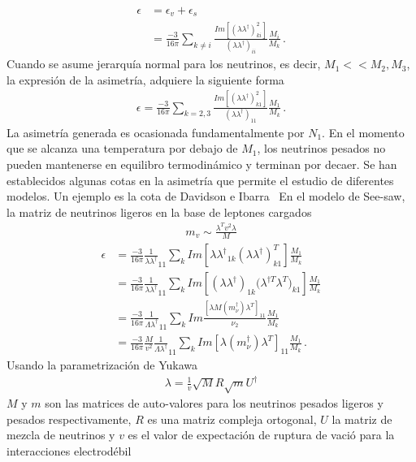 \begin{align}
\epsilon&=\epsilon_{v}+\epsilon_{s}\nonumber\\
&=\frac{-3}{16\pi}\sum_{k\not=i}\frac{Im[({\lambda\lambda^\dagger})_{ki}^2]}{{(\lambda\lambda^\dagger)}_{ii}}\frac{M_i}{M_k}\, . 
\end{align}
Cuando se asume jerarquía normal para los neutrinos, es decir, $M_{1}<<M_{2}, M_{3}$, la expresión de la asimetría, adquiere la siguiente forma
\begin{align}
\epsilon
=\frac{-3}{16\pi}\sum_{k=2,3}\frac{Im[({\lambda\lambda^\dagger})_{k1}^2]}{{(\lambda\lambda^\dagger)}_{11}}\frac{M_1}{M_k}\, . 
\end{align}
La asimetría generada es ocasionada fundamentalmente por $N_{1}$. En el momento que se alcanza una temperatura por debajo de $M_{1}$, los neutrinos pesados no pueden mantenerse en equilibro termodinámico y terminan por decaer.
Se han establecidos algunas cotas en la asimetría que permite el estudio de diferentes modelos. Un ejemplo es la cota de Davidson e Ibarra~\cite{Davidson:2002qv}
En el modelo de See-saw, la matriz de neutrinos ligeros en la base de leptones cargados~\cite{Davidson:2008bu}
\begin{align}
m_{v}\sim \frac{\lambda^Tv^2\lambda}{M}
\end{align}
\begin{align}
\epsilon&=\frac{-3}{16\pi}\frac{1}{\lambda\lambda^\dagger}_{11}\sum_{k}Im[{\lambda\lambda^\dagger}_{1k}{(\lambda\lambda^\dagger)}_{k1}^T]\frac{M_{1}}{M_{k}}\nonumber\\
&=\frac{-3}{16\pi}\frac{1}{\lambda\lambda^\dagger}_{11}\sum_{k}Im[({\lambda\lambda^\dagger})_{1k}{(\lambda^{\dagger T}\lambda^T})_{k1}]\frac{M_{1}}{M_{k}}\nonumber\\
&=\frac{-3}{16\pi}\frac{1}{\Lambda\lambda^\dagger}_{11}\sum_{k}Im
\frac{[\lambda M(m_{\nu}^{\dagger})\lambda^{T}]_{11}}{\nu_{2}}\frac{M_{1}}{M_{k}}
\nonumber\\
&=\frac{-3}{16\pi}\frac{M}{v^2}\frac{1}{\Lambda\lambda^\dagger}_{11}\sum_{k}Im
[\lambda(m_{\nu}^{\dagger})\lambda^{T}]_{11}\frac{M_{1}}{M_{k}}\, . 
\end{align}
Usando la parametrización de Yukawa~\cite{Casas:2001sr}
\begin{align}
\lambda=\frac{1}{v}\sqrt{M}R\sqrt{m}U^{\dagger}
\end{align}
$M$ y $m$ son las matrices de auto-valores para los neutrinos pesados ligeros y pesados respectivamente, $R$ es una matriz compleja ortogonal, $U$ la matriz de mezcla de neutrinos y $v$ es el valor de expectación de ruptura de vació para la interacciones electrodébil 
